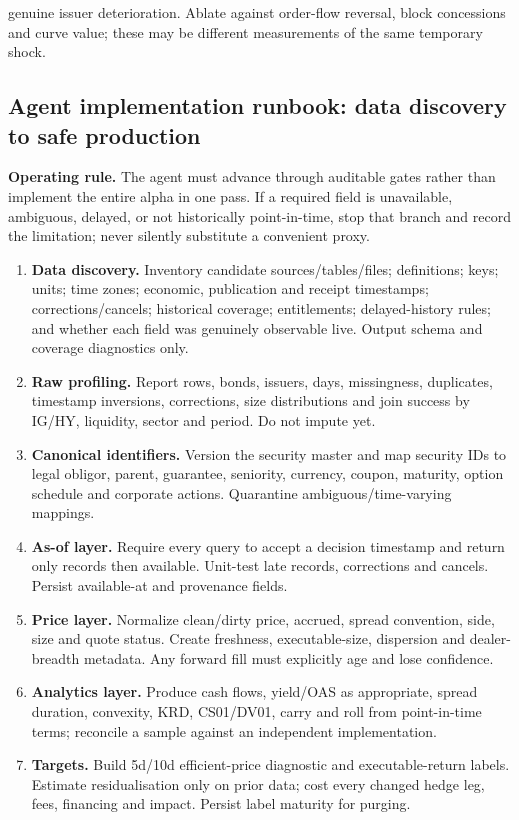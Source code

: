 \documentclass[10pt]{article}
\begin{document}
genuine issuer deterioration. Ablate against order-flow reversal, block concessions and curve value; these may be different measurements of the same temporary shock.
\subsection{Agent implementation runbook: data discovery to safe production}
\textbf{Operating rule.} The agent must advance through auditable gates rather than implement the entire alpha in one pass. If a required field is unavailable, ambiguous, delayed, or not historically point-in-time, stop that branch and record the limitation; never silently substitute a convenient proxy.
\begin{enumerate}[leftmargin=2em,label=\textbf{A\arabic*.}]
\item \textbf{Data discovery.} Inventory candidate sources/tables/files; definitions; keys; units; time zones; economic, publication and receipt timestamps; corrections/cancels; historical coverage; entitlements; delayed-history rules; and whether each field was genuinely observable live. Output schema and coverage diagnostics only.
\item \textbf{Raw profiling.} Report rows, bonds, issuers, days, missingness, duplicates, timestamp inversions, corrections, size distributions and join success by IG/HY, liquidity, sector and period. Do not impute yet.
\item \textbf{Canonical identifiers.} Version the security master and map security IDs to legal obligor, parent, guarantee, seniority, currency, coupon, maturity, option schedule and corporate actions. Quarantine ambiguous/time-varying mappings.
\item \textbf{As-of layer.} Require every query to accept a decision timestamp and return only records then available. Unit-test late records, corrections and cancels. Persist available-at and provenance fields.
\item \textbf{Price layer.} Normalize clean/dirty price, accrued, spread convention, side, size and quote status. Create freshness, executable-size, dispersion and dealer-breadth metadata. Any forward fill must explicitly age and lose confidence.
\item \textbf{Analytics layer.} Produce cash flows, yield/OAS as appropriate, spread duration, convexity, KRD, CS01/DV01, carry and roll from point-in-time terms; reconcile a sample against an independent implementation.
\item \textbf{Targets.} Build 5d/10d efficient-price diagnostic and executable-return labels. Estimate residualisation only on prior data; cost every changed hedge leg, fees, financing and impact. Persist label maturity for purging.

\end{enumerate}
\end{document}
